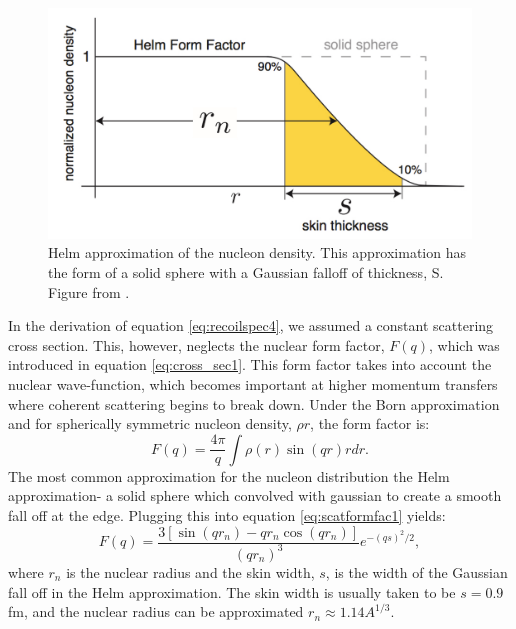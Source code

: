 \begin{figure}[h!]
\centering
\includegraphics[width=150mm]{Figures/helm.pdf}
\caption{Helm approximation of the nucleon density. This approximation has the form of a solid sphere with a Gaussian falloff of thickness, S. Figure from \cite{carlos}.}
\label{fig:helm} 
\end{figure}
In the derivation of equation \ref{eq:recoilspec4}, we assumed a constant scattering cross section. This, however, neglects the nuclear form factor, $F(q)$, which was introduced in equation \ref{eq:cross_sec1}. This form factor takes into account the nuclear wave-function, which becomes important at higher momentum transfers where coherent scattering begins to break down. Under the Born approximation and for spherically symmetric nucleon density, $\rho{r}$, the form factor is:
\begin{equation}\label{eq:scatformfac1}
F(q)=\frac{4\pi}{q}\int \rho(r)\sin(qr)rdr.
\end{equation}
The most common approximation for the nucleon distribution the Helm approximation- a solid sphere which convolved with gaussian to create a smooth fall off at the edge\cite{helm}. Plugging this into equation \ref{eq:scatformfac1} yields:
\begin{equation}\label{eq:scatformfac2}
F(q)=\frac{3[\sin(qr_n)-qr_n\cos(qr_n)]}{(qr_n)^3}e^{-(qs)^2/2},
\end{equation}
where $r_n$ is the nuclear radius and the skin width, $s$, is the width of the Gaussian fall off in the Helm approximation. The skin width is usually taken to be $s=0.9$ fm\cite{Lewin}, and the nuclear radius can be approximated $r_n\approx 1.14 A^{1/3}$.

